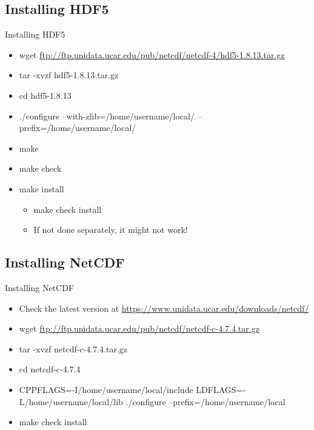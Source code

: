 \documentclass[compress,11pt,xcolor=svgnames,aspectratio=169]{beamer}
\begin{document}
\subsection{Installing HDF5}

\begin{frame}[fragile]{Installing HDF5}

\begin{itemize}
\setlength\itemsep{0.3cm}

  \item wget \url{ftp://ftp.unidata.ucar.edu/pub/netcdf/netcdf-4/hdf5-1.8.13.tar.gz}
  \item tar -xvzf hdf5-1.8.13.tar.gz
  \item cd hdf5-1.8.13
  \item ./configure --with-zlib=/home/username/local/ --prefix=/home/username/local/
  \item make
  \item make check
  \item make install
  \begin{itemize}
    \item make check install
    \item If not done separately, it might not work!
  \end{itemize}
\end{itemize}

\end{frame}

\subsection{Installing NetCDF}

\begin{frame}[fragile]{Installing NetCDF}

\begin{itemize}
\setlength\itemsep{0.3cm}

  \item Check the latest version at \url{https://www.unidata.ucar.edu/downloads/netcdf/}
  \item wget \url{ftp://ftp.unidata.ucar.edu/pub/netcdf/netcdf-c-4.7.4.tar.gz}
  \item tar -xvzf netcdf-c-4.7.4.tar.gz
  \item cd netcdf-c-4.7.4
  \item CPPFLAGS=-I/home/username/local/include LDFLAGS=-L/home/username/local/lib ./configure --prefix=/home/username/local
  \item make check install

\end{itemize}

\end{frame}
\end{document}
